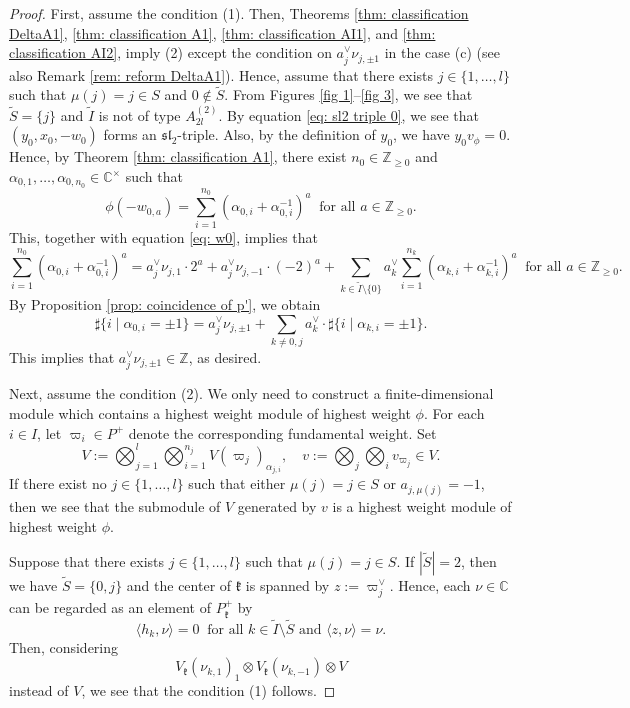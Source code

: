 \documentclass[12pt,a4paper]{amsart}
\theoremstyle{definition}
\numberwithin{equation}{subsection}
\begin{document}
\begin{proof}
  First, assume the condition (1).
  Then, Theorems \ref{thm: classification DeltaA1}, \ref{thm: classification A1}, \ref{thm: classification AI1}, and \ref{thm: classification AI2}, imply (2) except the condition on $a_j^\vee \nu_{j,\pm 1}$ in the case (c) (see also Remark \ref{rem: reform DeltaA1}).
  Hence, assume that there exists $j \in \{ 1,\dots,l \}$ such that $\mu(j) = j \in S$ and $0 \notin \tilde{S}$.
  From Figures \ref{fig 1}--\ref{fig 3}, we see that $\tilde{S} = \{j\}$ and $\tilde{I}$ is not of type $A_{2l}^{(2)}$.
  By equation \eqref{eq: sl2 triple 0}, we see that $(y_0,x_0,-w_0)$ forms an $\mathfrak{sl}_2$-triple.
  Also, by the definition of $y_0$, we have $y_0 v_\phi = 0$.
  Hence, by Theorem \ref{thm: classification A1}, there exist $n_0 \in \mathbb{Z}_{\geq 0}$ and $\alpha_{0,1},\dots,\alpha_{0,n_0} \in \mathbb{C}^\times$ such that
  \[
    \phi(-w_{0,a}) = \sum_{i=1}^{n_0} (\alpha_{0,i} + \alpha_{0,i}^{-1})^a \ \text{ for all } a \in \mathbb{Z}_{\geq 0}.
  \]
  This, together with equation \eqref{eq: w0}, implies that
  \[
    \sum_{i=1}^{n_0} (\alpha_{0,i}+\alpha_{0,i}^{-1})^a = a_j^\vee\nu_{j,1} \cdot 2^a + a_j^\vee\nu_{j,-1} \cdot (-2)^a + \sum_{k \in \tilde{I} \setminus \{0\}} a_k^\vee\sum_{i=1}^{n_k} (\alpha_{k,i}+\alpha_{k,i}^{-1})^a \ \text{ for all } a \in \mathbb{Z}_{\geq 0}.
  \]
  By Proposition \ref{prop: coincidence of p'}, we obtain
  \[
    \sharp\{ i \mid \alpha_{0,i} = \pm 1 \} = a_j^\vee \nu_{j,\pm 1} + \sum_{k \neq 0,j} a_k^\vee \cdot \sharp\{ i \mid \alpha_{k,i} = \pm 1 \}.
  \]
  This implies that $a_j^\vee \nu_{j,\pm 1} \in \mathbb{Z}$, as desired.

  Next, assume the condition (2).
  We only need to construct a finite-dimensional module which contains a highest weight module of highest weight $\phi$.
  For each $i \in I$, let $\varpi_i \in P^+$ denote the corresponding fundamental weight.
  Set
  \[
    V := \bigotimes_{j = 1}^l \bigotimes_{i=1}^{n_j} V(\varpi_j)_{\alpha_{j,i}}, \quad v := \bigotimes_j \bigotimes_i v_{\varpi_j} \in V.
  \]
  If there exist no $j \in \{ 1,\dots, l \}$ such that either $\mu(j) = j \in S$ or $a_{j,\mu(j)} = -1$, then we see that the submodule of $V$ generated by $v$ is a highest weight module of highest weight $\phi$.

  Suppose that there exists $j \in \{ 1,\dots, l \}$ such that $\mu(j) = j \in S$.
  If $|\tilde{S}| = 2$, then we have $\tilde{S} = \{ 0,j \}$ and the center of $\mathfrak{k}$ is spanned by $z := \varpi_j^\vee$.
  Hence, each $\nu \in \mathbb{C}$ can be regarded as an element of $P_\mathfrak{k}^+$ by
  \[
    \langle h_k, \nu \rangle = 0 \ \text{ for all } k \in \tilde{I} \setminus \tilde{S} \text{ and } \langle z, \nu \rangle = \nu.
  \]
  Then, considering
  \[
    V_\mathfrak{k}(\nu_{k,1})_1 \otimes V_{\mathfrak{k}}(\nu_{k,-1}) \otimes V
  \]
  instead of $V$, we see that the condition (1) follows.


\end{proof}
\end{document}
